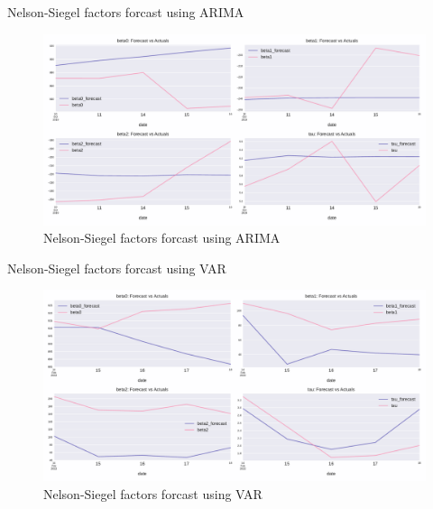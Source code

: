 \documentclass[aspectratio=169]{beamer}
\begin{document}
    \begin{frame}{Nelson-Siegel factors forcast using ARIMA}
        \begin{figure}
            \includegraphics[scale=0.47]{fig/ARIMAfcst.pdf}
            \caption{Nelson-Siegel factors forcast using ARIMA}
            \label{fig:VARnsfcst}
        \end{figure}
    \end{frame}


    \begin{frame}{Nelson-Siegel factors forcast using VAR}
        \begin{figure}
            \includegraphics[scale=0.47]{fig/VARforcasts.pdf}
            \caption{Nelson-Siegel factors forcast using VAR}
            \label{fig:VARnsfcst}
        \end{figure}
    \end{frame}
\end{document}
